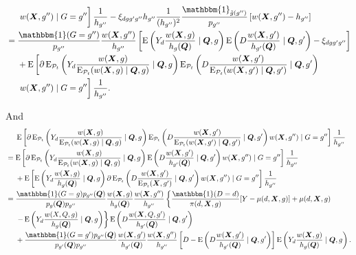 \documentclass[12pt,a4paper]{article}
\newcommand{\E}{\operatorname{E}}
\def\X{{\boldsymbol X}}
\def\Q{{\boldsymbol Q}}
\def\one{\mathbbm{1}}
\def\pheight{\frac{w(\X,g')}{\E_{\mathcal{P}_t}(w(\X,g') \mid \Q,g')}}
\begin{document}
\begin{align*}
    &\phantom{{}={}} \left. \vphantom{\pheight}
    w(\X,g'') \mid G=g'' \right] \frac{1}{h_{g''}}  -  \xi_{dgg'g''}h_{g''}\frac{1}{(h_{g''})^2}\frac{\one_{\Tilde{g}(g'')}}{p_{g''}}\left[w(\X,g'')-h_{g''}\right] \\
    &= \frac{\one(G=g'')}{p_{g''}}\frac{w(\X,g'')}{h_{g''}} \left[ \E \left(Y_d \frac{w(\X,g)}{h_{g}(\Q)}  \mid \Q, g \right) \E \left(D \frac{w(\X,g')}{h_{g'}(\Q)} \mid \Q, g' \right) - \xi_{dgg'g''} \right] \\
    &\phantom{{}={}} + \E \left[\partial \E_{\mathcal{P}_t} \left(Y_d \frac{w(\X,g)}{\E_{\mathcal{P}_t}(w(\X,g) \mid \Q,g)}  \mid \Q, g \right) \E_{\mathcal{P}_t} \left(D \frac{w(\X,g')}{\E_{\mathcal{P}_t}(w(\X,g') \mid \Q,g')} \mid \Q, g' \right) \right. \\ 
    &\phantom{{}={}} \left. \vphantom{\pheight}
    w(\X,g'') \mid G=g'' \right] \frac{1}{h_{g''}}.
\end{align*}

And
\begin{align*}
    &\phantom{{}={}} \E \left[\partial \E_{\mathcal{P}_t} \left(Y_d \frac{w(\X,g)}{\E_{\mathcal{P}_t}(w(\X,g) \mid \Q,g)}  \mid \Q, g \right) \E_{\mathcal{P}_t} \left(D \frac{w(\X,g')}{\E_{\mathcal{P}_t}(w(\X,g') \mid \Q,g')} \mid \Q, g' \right) 
    w(\X,g'') \mid G=g'' \right] \frac{1}{h_{g''}} \\
    &= \E \left[\partial \E_{\mathcal{P}_t} \left(Y_d \frac{w(\X,g)}{\E_{\mathcal{P}_t}(w(\X,g) \mid \Q,g)}  \mid \Q, g \right) \E \left(D \frac{w(\X,g')}{h_{g'}(\Q)} \mid \Q, g' \right) w(\X,g'') \mid G=g'' \right]\frac{1}{h_{g''}} \\
    &\phantom{{}={}} + \E \left[\E \left(Y_d \frac{w(\X,g)}{h_g(\Q)}  \mid \Q, g \right) \partial  \E_{\mathcal{P}_t} \left(D \frac{w(\X,g')}{\E_{\mathcal{P}_t}(\X,g')} \mid \Q, g' \right) w(\X,g'') \mid G=g'' \right]\frac{1}{h_{g''}} \\
    &= \frac{\one(G=g) p_{g''}(\Q)}{p_g(\Q)p_{g''}} \frac{w(\X,g)}{h_g(\Q)} \frac{w(\X,g'')}{h_{g''}} \left\{ \frac{\one(D=d)}{\pi(d,\X,g)} [Y-\mu(d,\X,g)]+\mu(d,\X,g) \right. \\
    &\phantom{{}={}} \left. - \E \left(Y_d \frac{w(X,Q,g)}{h_g(\Q)} \mid \Q,g \right) \right\} \E \left(D \frac{w(\X,Q,g')}{h_{g'}(\Q)} \mid \Q,g' \right) \\
    &\phantom{{}={}} + \frac{\one(G=g')p_{g''}(\Q)}{p_{g'}(\Q)p_{g''}} \frac{w(\X,g')}{h_{g'}(\Q)} \frac{w(\X,g'')}{h_{g''}} \left[ D-\E \left(D \frac{w(\X,g')}{h_{g'}(\Q)} \mid \Q, g' \right) \right]\E\left( Y_d \frac{w(\X,g)}{h_g(\Q)} \mid \Q, g \right).
\end{align*}
\end{document}
